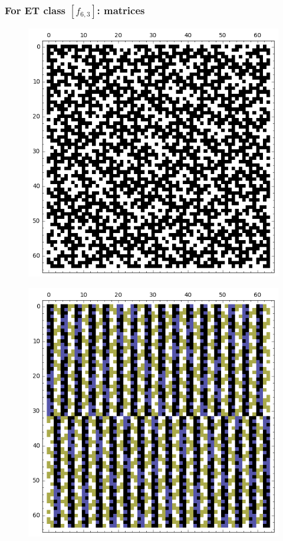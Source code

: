 \documentclass[pdf,sprung,slideColor,nocolorBG]{beamer}
\begin{document}
\begin{frame}
\frametitle{For ET class $[f_{6,3}]$: matrices}
\begin{figure}
\centering
\begin{minipage}{.48\textwidth}
  \centering
  \includegraphics[width=.9\linewidth]{../matrix_plot/c6_3_weight_class_matrix.png}
  \label{fig:6_3_weight_class_matrix}
\end{minipage}%
\begin{minipage}{.48\textwidth}
  \centering
  \includegraphics[width=.9\linewidth]{../matrix_plot/c6_3_bent_cayley_graph_index_matrix.png}
  \label{fig:6_3_bent_cayley_graph_index_matrix}
\end{minipage}
\end{figure}
\end{frame}
\end{document}
